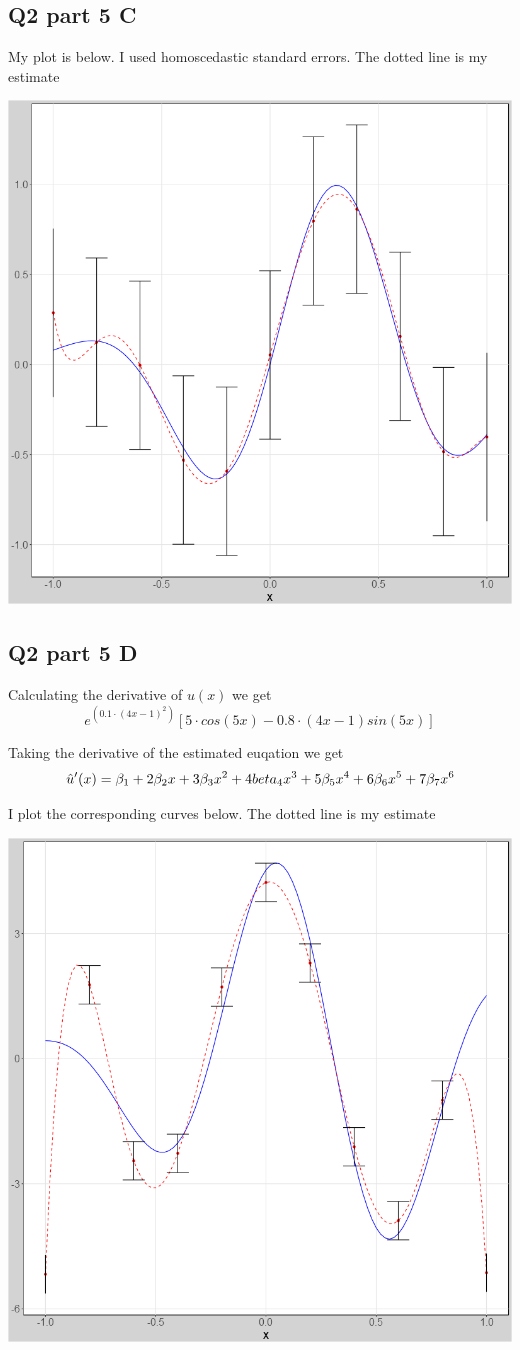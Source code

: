 \documentclass[11pt]{article}
\begin{document}
\subsection{ Q2 part 5 C}
My plot is below. I used homoscedastic standard errors.  The dotted line is my estimate
\begin{center}
	\includegraphics[width=.6\linewidth]{plot_2_5_c.png}
	
\end{center}

\subsection{Q2 part 5 D}
Calculating the derivative of $u(x)$ we get 
$$ e^{(0.1\cdot(4x-1)^2)}[5 \cdot cos(5x) - 0.8 \cdot (4x-1)sin(5x)]
$$

Taking the derivative of the estimated euqation we get 
$$\hat{u}'(x) = \beta_1 + 2\beta_2x + 3\beta_3x^2 + 4\\beta_4x^3 + 5\beta_5x^4 + 6\beta_6x^5 + 7\beta_7x^6$$

I plot the corresponding curves below. The dotted line is my estimate 
\begin{center}
	\includegraphics[width=.6\linewidth]{plot_2_5_d.png}
	
\end{center}
\end{document}
